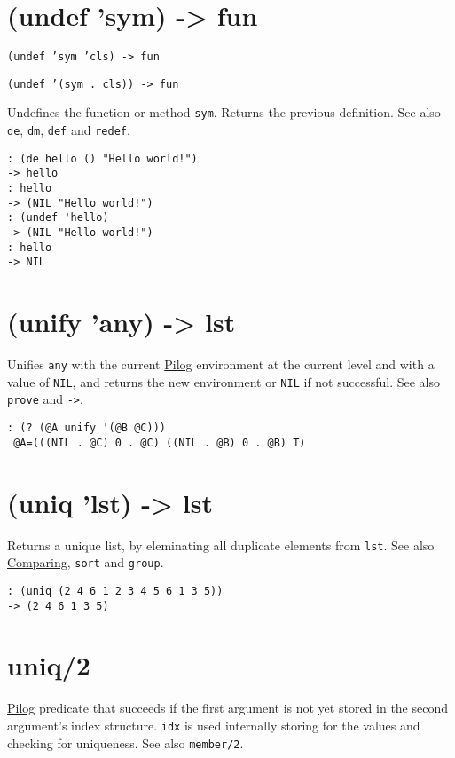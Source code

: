 {{{{{{{{ 
\section{(undef 'sym) -> fun}
\label{sec-8-1-21-7}


\texttt{(undef 'sym 'cls) -> fun}

\texttt{(undef '(sym . cls)) -> fun}

Undefines the function or method \texttt{sym}. Returns the previous definition.
See also \texttt{de}, \texttt{dm}, \texttt{def} and \texttt{redef}.


\begin{verbatim}
: (de hello () "Hello world!")
-> hello
: hello
-> (NIL "Hello world!")
: (undef 'hello)
-> (NIL "Hello world!")
: hello
-> NIL
\end{verbatim}

 
\section{(unify 'any) -> lst}
\label{sec-8-1-21-8}


Unifies \texttt{any} with the current \hyperref[ref.html-pilog]{Pilog} environment at
the current level and with a value of \texttt{NIL}, and returns the new
environment or \texttt{NIL} if not successful. See also \texttt{prove} and \texttt{->}.


\begin{verbatim}
: (? (@A unify '(@B @C)))
 @A=(((NIL . @C) 0 . @C) ((NIL . @B) 0 . @B) T)
\end{verbatim}

 
\section{(uniq 'lst) -> lst}
\label{sec-8-1-21-9}


Returns a unique list, by eleminating all duplicate elements from \texttt{lst}.
See also \hyperref[ref.html-cmp]{Comparing}, \texttt{sort} and \texttt{group}.


\begin{verbatim}
: (uniq (2 4 6 1 2 3 4 5 6 1 3 5))
-> (2 4 6 1 3 5)
\end{verbatim}

 
\section{uniq/2}
\label{sec-8-1-21-10}


\hyperref[ref.html-pilog]{Pilog} predicate that succeeds if the first argument
is not yet stored in the second argument's index structure. \texttt{idx} is
used internally storing for the values and checking for uniqueness. See
also \texttt{member/2}.


}}}}}}}}
